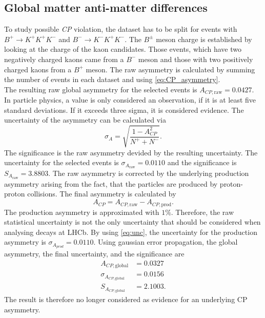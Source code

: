 \subsection{Global matter anti-matter differences}

To study possible \textit{CP} violation, the dataset has to be split for events with $B^+ \rightarrow K^+ K^+ K^-$ and $B^- \rightarrow K^- K^+ K^-$. The $B^{\pm}$ meson charge is established by 
looking at the charge of the kaon candidates. Those events, which have two negatively charged kaons came from a $B^-$ meson and those with two positively charged kaons from a $B^+$ meson.
The raw asymmetry is calculated by summing the number of events in each dataset and using \autoref{eq:CP_asymmetry}.\\
The resulting raw global asymmetry for the selected events is $A_{CP,\mathrm{raw}} = 0.0427$. In particle physics, a value is only considered an observation, if it is at least five standard deviations. If it exceeds
three sigma, it is considered evidence. The uncertainty of the asymmetry can be calculated via
\begin{equation}
  \label{eq:unc}
  \sigma_A = \sqrt{\frac{1-A_{CP}^2}{N^+ + N^-}}.
\end{equation}
The significance is the raw asymmetry devided by the resulting uncertainty. The uncertainty for the selected events is $\sigma_{A_{\mathrm{raw}}} = 0.0110$ and the significance is $S_{A_{\mathrm{raw}}} = 3.8803$.
The raw asymmetry is corrected by the underlying production asymmetry arising from the fact, that the particles are
produced by proton-proton collisions. The final asymmetry is calculated by
\begin{equation*}
  A_{CP} = A_{CP,\mathrm{raw}} - A_{CP,\mathrm{prod}}.
\end{equation*}
The production asymmetry is approximated with $1\%$. Therefore, the raw statistical uncertainty is not the only uncertainty that should be considered when analysing decays at LHCb. By using \autoref{eq:unc}, the uncertainty
for the production asymmetry is $\sigma_{A_{prod}} = 0.0110$. Using gaussian error propagation, the global asymmetry, the final uncertainty, and the significance are
\begin{align*}
  A_{CP, \mathrm{global}} &= 0.0327\\
  \sigma_{A_{CP,\mathrm{global}}} &=  0.0156 \\ %
  S_{A_{CP,\mathrm{global}}} &= 2.1003.
\end{align*}
The result is therefore no longer considered as evidence for an underlying CP asymmetry.


